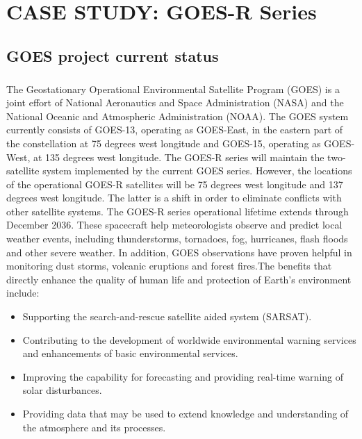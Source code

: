 \chapter{\normalsize{CASE STUDY: GOES-R Series}}
\section{GOES project current status}
\paragraph{}
The Geostationary Operational Environmental Satellite Program (GOES) is a joint effort of  National Aeronautics and Space Administration (NASA) and the National Oceanic and Atmospheric Administration (NOAA). The GOES system currently consists of GOES-13, operating as GOES-East, in the eastern part of the constellation at 75 degrees west longitude and GOES-15, operating as GOES-West, at 135 degrees west longitude. The GOES-R series will maintain the two-satellite system implemented by the current GOES series. However, the locations of the operational GOES-R satellites will be 75 degrees west longitude and 137 degrees west longitude. The latter is a shift in order to eliminate conflicts with other satellite systems. The GOES-R series operational lifetime extends through December 2036.
These spacecraft help meteorologists observe and predict local weather events, including thunderstorms, tornadoes, fog, hurricanes, flash floods and other severe weather. In addition, GOES observations have proven helpful in monitoring dust storms, volcanic eruptions and forest fires.The benefits that directly enhance the quality of human life and protection of Earth's environment include:
\begin{itemize} 
\item Supporting the search-and-rescue satellite aided system (SARSAT).
\item Contributing to the development of worldwide environmental warning services and enhancements of basic environmental services.
\item Improving the capability for forecasting and providing real-time warning of solar disturbances.
\item Providing data that may be used to extend knowledge and understanding of the atmosphere and its processes.
\end{itemize}	
